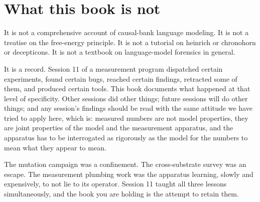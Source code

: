 \documentclass[11pt,openany]{book}
\begin{document}
\chapter{What this book is not}

It is not a comprehensive account of causal-bank language modeling.
It is not a treatise on the free-energy principle. It is not a
tutorial on heinrich or chronohorn or decepticons. It is not a
textbook on language-model forensics in general.

It is a record. Session 11 of a measurement program dispatched
certain experiments, found certain bugs, reached certain findings,
retracted some of them, and produced certain tools. This book
documents what happened at that level of specificity. Other sessions
did other things; future sessions will do other things; and any
session's findings should be read with the same attitude we have
tried to apply here, which is: measured numbers are not model
properties, they are joint properties of the model and the
measurement apparatus, and the apparatus has to be interrogated as
rigorously as the model for the numbers to mean what they appear to
mean.

The mutation campaign was a confinement. The cross-substrate survey
was an escape. The measurement plumbing work was the apparatus
learning, slowly and expensively, to not lie to its operator. Session
11 taught all three lessons simultaneously, and the book you are
holding is the attempt to retain them.
\end{document}
